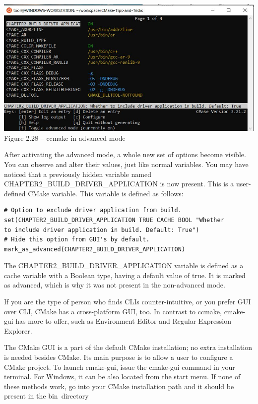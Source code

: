 \begin{center}
\includegraphics[width=1.\textwidth]{content/1/chapter2/images/28.jpg}\\
Figure 2.28 – ccmake in advanced mode
\end{center}

After activating the advanced mode, a whole new set of options become visible. You can observe and alter their values, just like normal variables. You may have noticed that a previously hidden variable named CHAPTER2\_BUILD\_DRIVER\_APPLICATION is now present. This is a user-defined CMake variable. This variable is defined as follows:

\begin{lstlisting}[style=styleCMake]
# Option to exclude driver application from build.
set(CHAPTER2_BUILD_DRIVER_APPLICATION TRUE CACHE BOOL "Whether
to include driver application in build. Default: True")
# Hide this option from GUI's by default.
mark_as_advanced(CHAPTER2_BUILD_DRIVER_APPLICATION)
\end{lstlisting}

The CHAPTER2\_BUILD\_DRIVER\_APPLICATION variable is defined as a cache variable with a Boolean type, having a default value of true. It is marked as advanced, which is why it was not present in the non-advanced mode.


If you are the type of person who finds CLIs counter-intuitive, or you prefer GUI over CLI, CMake has a cross-platform GUI, too. In contrast to ccmake, cmake-gui has more to offer, such as Environment Editor and Regular Expression Explorer.

The CMake GUI is a part of the default CMake installation; no extra installation is needed besides CMake. Its main purpose is to allow a user to configure a CMake project. To launch cmake-gui, issue the cmake-gui command in your terminal. For Windows, it can be also located from the start menu. If none of these methods work, go into your CMake installation path and it should be present in the bin\ directory


